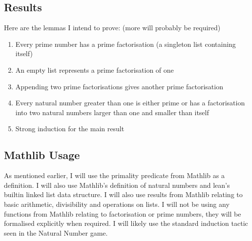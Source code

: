 \documentclass{article}
\begin{document}
\subsection{Results}
Here are the lemmas I intend to prove: (more will probably be required)
\begin{enumerate}
  \item Every prime number has a prime factorisation (a singleton list containing itself)
  \item An empty list represents a prime factorisation of one
  \item Appending two prime factorisations gives another prime factorisation 
  \item Every natural number greater than one is either prime or has a factorisation into 
  two natural numbers larger than one and smaller than itself
  \item Strong induction for the main result
\end{enumerate} 

\subsection{Mathlib Usage}
As mentioned earlier, I will use the primality predicate from Mathlib as a definition. I will 
also use Mathlib's definition of natural numbers and lean's builtin linked list data structure.
I will also use results from Mathlib relating to basic arithmetic, divisibility and operations
on lists. I will not be using any functions from Mathlib relating to factorisation or prime 
numbers, they will be formalised explicitly when required. I will likely use the standard induction
tactic seen in the Natural Number game.
\end{document}
